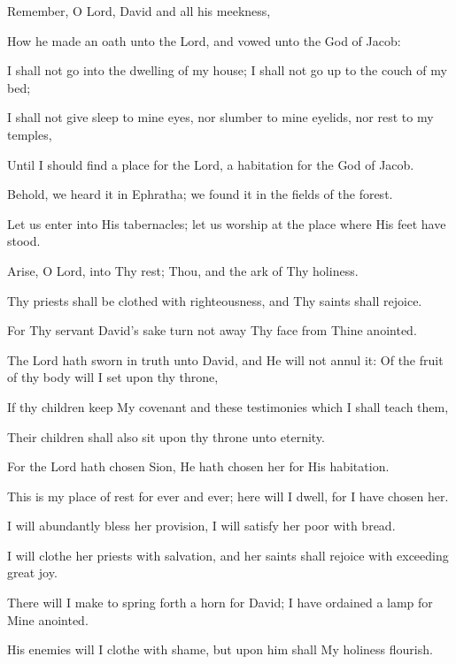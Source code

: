 Remember, O Lord, David and all his meekness,

How he made an oath unto the Lord, and vowed unto the God of Jacob:

I shall not go into the dwelling of my house; I shall not go up to the couch of my bed;

I shall not give sleep to mine eyes, nor slumber to mine eyelids, nor rest to my temples,

Until I should find a place for the Lord, a habitation for the God of Jacob.

Behold, we heard it in Ephratha; we found it in the fields of the forest.

Let us enter into His tabernacles; let us worship at the place where His feet have stood.

Arise, O Lord, into Thy rest; Thou, and the ark of Thy holiness.

Thy priests shall be clothed with righteousness, and Thy saints shall rejoice.

For Thy servant David's sake turn not away Thy face from Thine anointed.

The Lord hath sworn in truth unto David, and He will not annul it: Of the fruit of thy body will I set upon thy throne,

If thy children keep My covenant and these testimonies which I shall teach them,

Their children shall also sit upon thy throne unto eternity.

For the Lord hath chosen Sion, He hath chosen her for His habitation.

This is my place of rest for ever and ever; here will I dwell, for I have chosen her.

I will abundantly bless her provision, I will satisfy her poor with bread.

I will clothe her priests with salvation, and her saints shall rejoice with exceeding great joy.

There will I make to spring forth a horn for David; I have ordained a lamp for Mine anointed.

His enemies will I clothe with shame, but upon him shall My holiness flourish.
